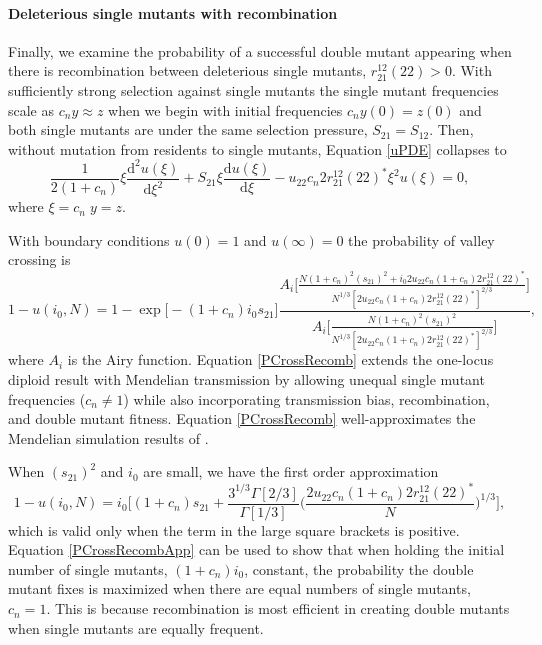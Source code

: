 \documentclass[review,3p,authoryear]{elsarticle}
\begin{document}
\paragraph{Deleterious single mutants with recombination}

Finally, we examine the probability of a successful double mutant appearing when there is recombination between deleterious single mutants, $r_{21}^{12}(22) > 0$.
With sufficiently strong selection against single mutants the single mutant frequencies scale as $c_n y\approx z$ when we begin with initial frequencies $c_n y(0) = z(0)$ and  both single mutants are under the same selection pressure, $S_{21}= S_{12}$. 
Then, without mutation from residents to single mutants, Equation \eqref{uPDE} collapses to
\begin{equation}\label{RecombDEu}
\frac{1}{2 (1 + c_n)} \xi \frac{\mathrm{d}^2 u(\xi)}{\mathrm{d} \xi^2} + S_{21} \xi \frac{\mathrm{d} u(\xi)}{\mathrm{d} \xi} - u_{22} c_n 2r_{21}^{12}(22)^* \xi^2 u(\xi) = 0,
\end{equation}
where $\xi = c_n \; y = z$. 

With boundary conditions $u(0) = 1$ and $u(\infty)=0$ the probability of valley crossing is
\begin{equation}\label{PCrossRecomb}
1 - u (i_0, N) = 1 - \exp \Big[ -(1+c_n) i_0 s_{21} \Big] \frac{A_i \Big[ \frac{ N (1+c_n)^2 (s_{21})^2 + i_0 2u_{22} c_n(1+c_n) 2r_{21}^{12}(22)^* }{ N^{1/3} [ 2u_{22} c_n (1+c_n) 2r_{21}^{12}(22)^* ]^{2/3} } \Big]}{A_i \Big[ \frac{ N (1+c_n)^2 (s_{21})^2}{N^{1/3}[2u_{22} c_n (1+c_n) 2 r_{21}^{12}(22)^* ]^{2/3} } \Big]},
\end{equation}
where $A_i$ is the Airy function.
Equation \eqref{PCrossRecomb} extends the one-locus diploid result with Mendelian transmission \cite[equation 28 in][]{Karlin1981b} by allowing unequal single mutant frequencies ($c_n\neq 1$) while also incorporating transmission bias, recombination, and double mutant fitness.
Equation \eqref{PCrossRecomb} well-approximates the Mendelian simulation results of \citeauthor{Michalakis1996} \citeyearpar[][see supplementary \textit{Mathematica} file]{Michalakis1996}.

When $(s_{21})^2$ and $i_0$ are small, we have the first order approximation
\begin{equation}\label{PCrossRecombApp}
1 - u(i_0, N) = i_0 \Big[ (1 + c_n) s_{21} + \frac{3^{1/3} \Gamma [2/3]}{\Gamma[1/3]} \bigg(\frac{ 2u_{22} c_n(1+c_n) 2r_{21}^{12}(22)^* }{N} \bigg)^{1/3} \Big],
\end{equation}
which is valid only when the term in the large square brackets is positive. 
Equation \eqref{PCrossRecombApp} can be used to show that when holding the initial number of single mutants, $(1+c_n)i_0$, constant, the probability the double mutant fixes is maximized when there are equal numbers of single mutants, $c_n=1$.
This is because recombination is most efficient in creating double mutants when single mutants are equally frequent. 
\end{document}
